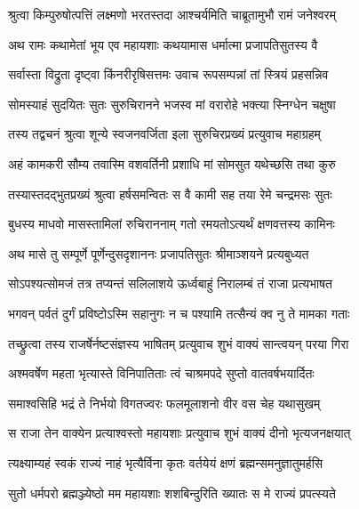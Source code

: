 \twolineshloka
{श्रुत्वा किम्पुरुषोत्पत्तिं लक्ष्मणो भरतस्तदा}
{आश्चर्यमिति चाब्रूतामुभौ रामं जनेश्वरम्} %

\twolineshloka
{अथ रामः कथामेतां भूय एव महायशाः}
{कथयामास धर्मात्मा प्रजापतिसुतस्य वै} %

\twolineshloka
{सर्वास्ता विद्रुता दृष्ट्वा किंनरीरृषिसत्तमः}
{उवाच रूपसम्पन्नां तां स्त्रियं प्रहसन्निव} %

\twolineshloka
{सोमस्याहं सुदयितः सुतः सुरुचिरानने}
{भजस्व मां वरारोहे भक्त्या स्निग्धेन चक्षुषा} %

\twolineshloka
{तस्य तद्वचनं श्रुत्वा शून्ये स्वजनवर्जिता}
{इला सुरुचिरप्रख्यं प्रत्युवाच महाग्रहम्} %

\twolineshloka
{अहं कामकरी सौम्य तवास्मि वशवर्तिनी}
{प्रशाधि मां सोमसुत यथेच्छसि तथा कुरु} %

\twolineshloka
{तस्यास्तदद्भुतप्रख्यं श्रुत्वा हर्षसमन्वितः}
{स वै कामी सह तया रेमे चन्द्रमसः सुतः} %

\twolineshloka
{बुधस्य माधवो मासस्तामिलां रुचिराननाम्}
{गतो रमयतोऽत्यर्थं क्षणवत्तस्य कामिनः} %

\twolineshloka
{अथ मासे तु सम्पूर्णे पूर्णेन्दुसदृशाननः}
{प्रजापतिसुतः श्रीमाञ्शयने प्रत्यबुध्यत} %

\twolineshloka
{सोऽपश्यत्सोमजं तत्र तप्यन्तं सलिलाशये}
{ऊर्ध्वबाहुं निरालम्बं तं राजा प्रत्यभाषत} %

\twolineshloka
{भगवन् पर्वतं दुर्गं प्रविष्टोऽस्मि सहानुगः}
{न च पश्यामि तत्सैन्यं क्व नु ते मामका गताः} %

\twolineshloka
{तच्छ्रुत्वा तस्य राजर्षेर्नष्टसंज्ञस्य भाषितम्}
{प्रत्युवाच शुभं वाक्यं सान्त्वयन् परया गिरा} %

\twolineshloka
{अश्मवर्षेण महता भृत्यास्ते विनिपातिताः}
{त्वं चाश्रमपदे सुप्तो वातवर्षभयार्दितः} %

\twolineshloka
{समाश्वसिहि भद्रं ते निर्भयो विगतज्वरः}
{फलमूलाशनो वीर वस चेह यथासुखम्} %

\twolineshloka
{स राजा तेन वाक्येन प्रत्याश्वस्तो महायशाः}
{प्रत्युवाच शुभं वाक्यं दीनो भृत्यजनक्षयात्} %

\twolineshloka
{त्यक्ष्याम्यहं स्वकं राज्यं नाहं भृत्यैर्विना कृतः}
{वर्तयेयं क्षणं ब्रह्मन्समनुज्ञातुमर्हसि} %

\twolineshloka
{सुतो धर्मपरो ब्रह्मञ्ज्येष्ठो मम महायशाः}
{शशबिन्दुरिति ख्यातः स मे राज्यं प्रपत्स्यते} %

